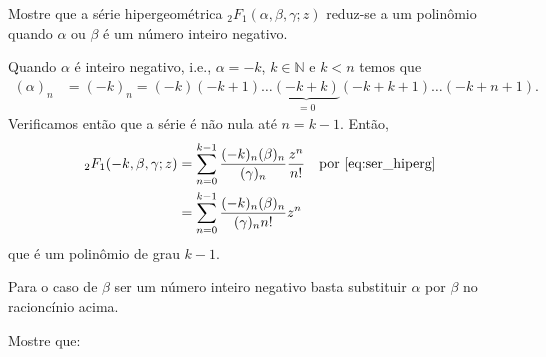 \documentclass[a4paper,10pt, leqno, answers]{exam}  %
\begin{document}
\begin{questions}
    \question Mostre que a s\'{e}rie hipergeom\'{e}trica ${}_2F_1(\alpha, \beta, \gamma; z)$ reduz-se a um polin\^{o}mio quando $\alpha$ ou $\beta$ \'{e} um número inteiro negativo.
    \begin{solution}
        Quando $\alpha$ \'{e} inteiro negativo, i.e., $\alpha = -k$, $k \in \mathbb{N}$ e $k < n$ temos que
        \begin{align*}
            (\alpha)_n &= (-k)_n = (-k) (-k + 1) \ldots \underbrace{(-k + k)}_{= 0} (-k + k + 1) \ldots (-k + n + 1).
        \end{align*}
        Verificamos ent\~{a}o que a s\'{e}rie \'{e} n\~{a}o nula at\'{e} $n = k - 1$. Ent\~{a}o,
        \begin{align*}
            {}_2F_1(-k, \beta, \gamma; z) &= \sum_{n = 0}^{k - 1} \frac{(-k)_n (\beta)_n}{(\gamma)_n} \frac{z^n}{n!} && \text{por \eqref{eq:ser_hiperg}} \\
            &= \sum_{n = 0}^{k - 1} \frac{(-k)_n (\beta)_n}{(\gamma)_n n!} z^n 
        \end{align*}
        que \'{e} um polinômio de grau $k - 1$.

        Para o caso de $\beta$ ser um n\'{u}mero inteiro negativo basta substituir $\alpha$ por $\beta$ no racionc\'{i}nio acima.
    \end{solution}

     Mostre que:
\end{questions}
\end{document}
